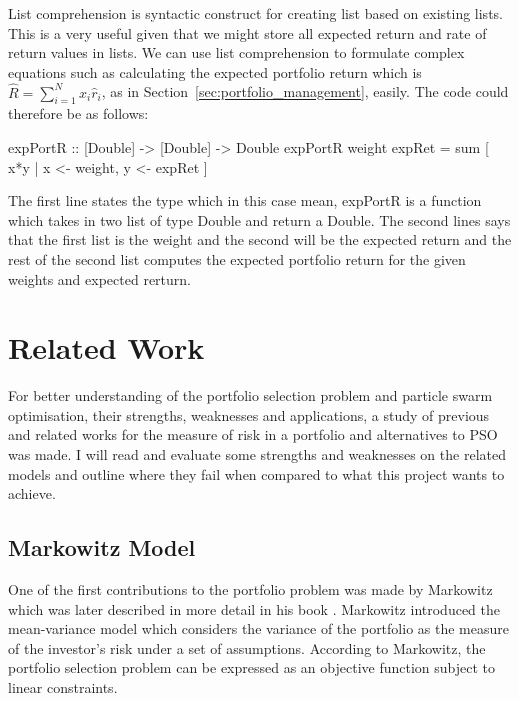 \documentclass{pdfmx4020}
\begin{document}
  List comprehension \cite{list_comp} is syntactic construct for creating list based on existing lists. This is a very useful given that we might store all expected return and rate of return values in lists. We can use list comprehension to formulate complex equations such as calculating the expected portfolio return which is $\widehat{R} = \sum_{i=1}^N  x_i \widehat{r}_i$, as in Section~\ref{sec:portfolio_management}, easily. The code could therefore be as follows: 
  \begin{code}
  expPortR :: [Double] -> [Double] -> Double
  expPortR weight expRet = sum [ x*y | x <- weight, y <- expRet ]
  \end{code}
  The first line states the type which in this case mean, expPortR is a function which takes in two list of type Double and return a Double. The second lines says that the first list is the weight and the second will be the expected return and the rest of the second list computes the expected portfolio return for the given weights and expected rerturn. 

    


\chapter{Related Work}
For better understanding of the portfolio selection problem and particle swarm optimisation, their strengths, weaknesses and applications, a study of previous and related works for the measure of risk in a portfolio and alternatives to PSO was made. I will read and evaluate some strengths and weaknesses on the related models and outline where they fail when compared to what this project wants to achieve. 

  \section{Markowitz Model} %
  \label{sec:markowitz_model}
    One of the first contributions to the portfolio problem was made by Markowitz \cite{marko1} which was later described in more detail in his book \cite{marko2}. Markowitz introduced the mean-variance model which considers the variance of the portfolio as the measure of the investor's risk under a set of assumptions. According to Markowitz, the portfolio selection problem can be expressed as an objective function subject to linear constraints. 
\end{document}
